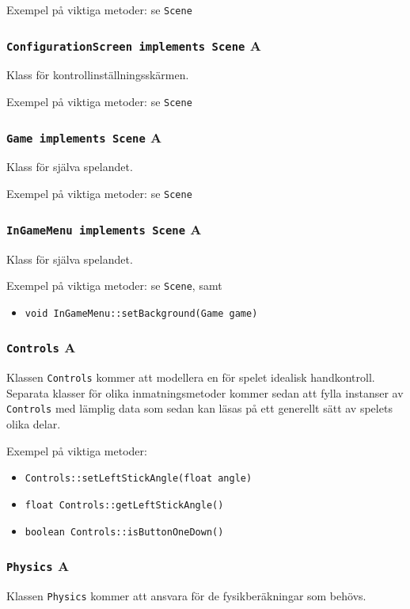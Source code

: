 \documentclass[a4paper,11pt]{article}
\begin{document}
\bigskip
\noindent Exempel på viktiga metoder: se \texttt{Scene}

\subsubsection{\texttt{ConfigurationScreen implements Scene} A}
\noindent Klass för kontrollinställningsskärmen.

\bigskip
\noindent Exempel på viktiga metoder: se \texttt{Scene}

\subsubsection{\texttt{Game implements Scene} A}
\noindent Klass för själva spelandet.

\bigskip
\noindent Exempel på viktiga metoder: se \texttt{Scene}

\subsubsection{\texttt{InGameMenu implements Scene} A}
\noindent Klass för själva spelandet.

\bigskip
\noindent Exempel på viktiga metoder: se \texttt{Scene}, samt
\begin{itemize}
\item \texttt{void InGameMenu::setBackground(Game game)}
\end{itemize}

\subsubsection{\texttt{Controls} A}
\noindent Klassen \texttt{Controls} kommer att modellera en för spelet
idealisk handkontroll. Separata klasser för olika inmatningsmetoder
kommer sedan att fylla instanser av \texttt{Controls} med lämplig data
som sedan kan läsas på ett generellt sätt av spelets olika delar.

\bigskip
\noindent Exempel på viktiga metoder:
\begin{itemize}
\item \texttt{Controls::setLeftStickAngle(float angle)}
\item \texttt{float Controls::getLeftStickAngle()}
\item \texttt{boolean Controls::isButtonOneDown()}
\end{itemize}

\subsubsection{\texttt{Physics} A}
\noindent Klassen \texttt{Physics} kommer att ansvara för de fysikberäkningar
som behövs. 
\end{document}
